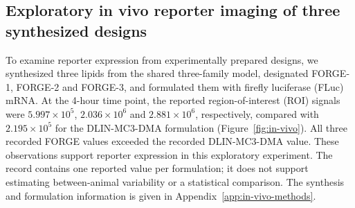 \documentclass{article}
\theoremstyle{definition}
\begin{document}
\subsection{Exploratory in vivo reporter imaging of three synthesized designs}
\label{sec:in-vivo}

To examine reporter expression from experimentally prepared designs, we synthesized three lipids
from the shared three-family model, designated FORGE-1, FORGE-2 and FORGE-3, and formulated them
with firefly luciferase (FLuc) mRNA. At the 4-hour time point, the reported region-of-interest (ROI)
signals were $5.997\times10^5$, $2.036\times10^6$ and $2.881\times10^6$, respectively, compared
with $2.195\times10^5$ for the DLIN-MC3-DMA formulation (Figure~\ref{fig:in-vivo}). All three recorded FORGE
values exceeded the recorded DLIN-MC3-DMA value. These observations support reporter expression in this
exploratory experiment. The record contains one reported value per formulation; it does not support
estimating between-animal variability or a statistical comparison. The synthesis and formulation
information is given in Appendix~\ref{app:in-vivo-methods}.
\end{document}
